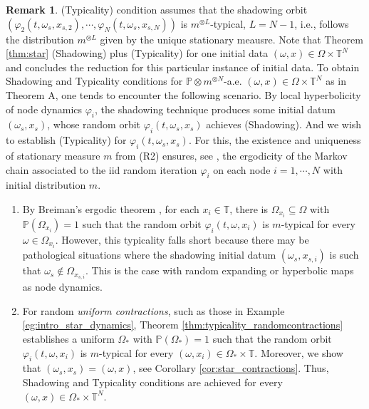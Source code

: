 \documentclass[a4paper]{article}
\theoremstyle{plain}
\theoremstyle{definition}
\newtheorem{rem}[theorem]{Remark}
\newcommand{\PP}{\mathbb{P}}
\newcommand{\T}{\mathbb{T}}
\begin{document}
\begin{rem} \label{rem:star_typicality}
	(Typicality) condition assumes that the shadowing orbit $(\varphi_2(t,\omega_{{s}},x_{{s},2}),\cdots,\varphi_N(t,\omega_{{s}},x_{{s},N}))$ is $m^{\otimes L}$-typical, $L=N-1$, i.e., follows the distribution $m^{\otimes L}$ given by the unique stationary meausre. Note that Theorem \ref{thm:star} (Shadowing) plus (Typicality) for one initial data $(\omega,x)\in \Omega\times \T^{N}$ and concludes the reduction for this particular instance of initial data. 
	To obtain Shadowing and Typicality conditions for $\PP\otimes m^{\otimes N}$-a.e. $(\omega,x)\in\Omega\times \T^N$ as in Theorem A, one tends to encounter the following scenario. By local hyperbolicity of node dynamics $\varphi_i$,  
	the shadowing technique produces some initial datum $(\omega_s,x_s)$, whose random orbit $\varphi_i(t,\omega_s,x_s)$ achieves (Shadowing). And we wish to establish (Typicality) for $\varphi_i(t,\omega_s,x_s)$. For this, the existence and uniqueness of stationary measure $m$ from (R2) ensures, see \cite[Theorem 16.4]{Bhattacharya2022}, the ergodicity of the Markov chain associated to the iid random iteration $\varphi_i$ on each node $i=1,\cdots,N$ with initial distribution $m$.
	\begin{enumerate}
		\item By Breiman's ergodic theorem \cite{Breiman1960}, for each $x_i\in\T$, there is $\Omega_{x_i}\subseteq\Omega$ with $\PP(\Omega_{x_i})=1$ such that the random orbit $\varphi_i(t,\omega,x_i)$ is $m$-typical for every $\omega\in \Omega_{x_i}$. However, this typicality falls short because there may be pathological situations where the shadowing initial datum $(\omega_s,x_{s,i})$ is such that $\omega_s \notin \Omega_{x_{s,i}}$.
This is the case with random expanding or hyperbolic maps as node dynamics. 
		
		
		\item For random \textit{uniform contractions}, such as those in Example \ref{eg:intro_star_dynamics},
		 Theorem \ref{thm:typicality_randomcontractions} establishes a uniform $\Omega_*$ with $\PP(\Omega_*)=1$ such that the random orbit $\varphi_i(t,\omega,x_i)$ is $m$-typical for every $(\omega,x_i)\in \Omega_*\times\T$. Moreover, we show that $(\omega_s,x_{s})=(\omega,x)$, see Corollary \ref{cor:star_contractions}. Thus, Shadowing and Typicality conditions are achieved for every $(\omega,x)\in \Omega_*\times\T^N$.
	\end{enumerate} 
\end{rem}
\end{document}
